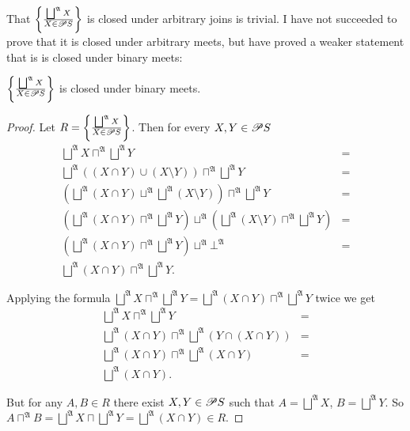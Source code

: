 That $\left\{ \frac{\bigsqcup^{\mathfrak{A}}X}{X\in\mathscr{P} S}\right\}$ is closed
under arbitrary joins is trivial. I have not succeeded to prove that
it is closed under arbitrary meets, but have proved a weaker statement
that is is closed under binary meets:
\begin{prop}
$\left\{ \frac{\bigsqcup^{\mathfrak{A}}X}{X\in\mathscr{P} S}\right\}$ is closed under
binary meets.\end{prop}
\begin{proof}
Let $R=\left\{ \frac{\bigsqcup^{\mathfrak{A}}X}{X\in\mathscr{P} S}\right\}$. Then
for every $X,Y\in\mathscr{P} S$
\begin{align*}
\bigsqcup^{\mathfrak{A}}X\sqcap^{\mathfrak{A}}\bigsqcup^{\mathfrak{A}}Y & =\\
\bigsqcup^{\mathfrak{A}}((X\cap Y)\cup(X\setminus Y))\sqcap^{\mathfrak{A}}\bigsqcup^{\mathfrak{A}}Y & =\\
\left(\bigsqcup^{\mathfrak{A}}(X\cap Y)\sqcup^{\mathfrak{A}}\bigsqcup^{\mathfrak{A}}(X\setminus Y)\right)\sqcap^{\mathfrak{A}}\bigsqcup^{\mathfrak{A}}Y & =\\
\left(\bigsqcup^{\mathfrak{A}}(X\cap Y)\sqcap^{\mathfrak{A}}\bigsqcup^{\mathfrak{A}}Y\right)\sqcup^{\mathfrak{A}}\left(\bigsqcup^{\mathfrak{A}}(X\setminus Y)\sqcap^{\mathfrak{A}}\bigsqcup^{\mathfrak{A}}Y\right) & =\\
\left(\bigsqcup^{\mathfrak{A}}(X\cap Y)\sqcap^{\mathfrak{A}}\bigsqcup^{\mathfrak{A}}Y\right)\sqcup^{\mathfrak{A}}\bot^{\mathfrak{A}} & =\\
\bigsqcup^{\mathfrak{A}}(X\cap Y)\sqcap^{\mathfrak{A}}\bigsqcup^{\mathfrak{A}}Y.
\end{align*}


Applying the formula $\bigsqcup^{\mathfrak{A}}X\sqcap^{\mathfrak{A}}\bigsqcup^{\mathfrak{A}}Y=\bigsqcup^{\mathfrak{A}}(X\cap Y)\sqcap^{\mathfrak{A}}\bigsqcup^{\mathfrak{A}}Y$
twice we get
\begin{align*}
\bigsqcup^{\mathfrak{A}}X\sqcap^{\mathfrak{A}}\bigsqcup^{\mathfrak{A}}Y & =\\
\bigsqcup^{\mathfrak{A}}(X\cap Y)\sqcap^{\mathfrak{A}}\bigsqcup^{\mathfrak{A}}(Y\cap(X\cap Y)) & =\\
\bigsqcup^{\mathfrak{A}}(X\cap Y)\sqcap^{\mathfrak{A}}\bigsqcup^{\mathfrak{A}}(X\cap Y) & =\\
\bigsqcup^{\mathfrak{A}}(X\cap Y).
\end{align*}


But for any $A,B\in R$ there exist $X,Y\in\mathscr{P} S$ such that
$A=\bigsqcup^{\mathfrak{A}}X$, $B=\bigsqcup^{\mathfrak{A}}Y$. So
$A\sqcap^{\mathfrak{A}}B=\bigsqcup^{\mathfrak{A}}X\sqcap\bigsqcup^{\mathfrak{A}}Y=\bigsqcup^{\mathfrak{A}}(X\cap Y)\in R$.
\end{proof}

